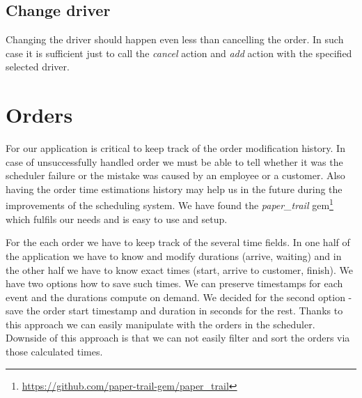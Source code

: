 \subsection{Change driver}
Changing the driver should happen even less than cancelling the order. In such case it is sufficient just to call the \textit{cancel} action and \textit{add} action with the specified selected driver.
	 
	 
	 
\section {Orders}

	For our application is critical to keep track of the order modification history. In case of unsuccessfully handled order we must be able to tell whether it was the scheduler failure or the mistake was caused by an employee or a customer. Also having the order time estimations history may help us in the future during the improvements of the scheduling system. We have found the \textit{paper\_trail} gem\footnote{\url{https://github.com/paper-trail-gem/paper_trail}} which fulfils our needs and is easy to use and setup.
	
	
	For the each order we have to keep track of the several time fields. In one half of the application we have to know and modify durations (arrive, waiting) and in the other half we have to know exact times (start, arrive to customer, finish). We have two options how to save such times. We can preserve timestamps for each event and the durations compute on demand. We decided for the second option - save the order start timestamp and duration in seconds for the rest. Thanks to this approach we can easily manipulate with the orders in the scheduler.  Downside of this approach is that we can not easily filter and sort the orders via those calculated times.   

